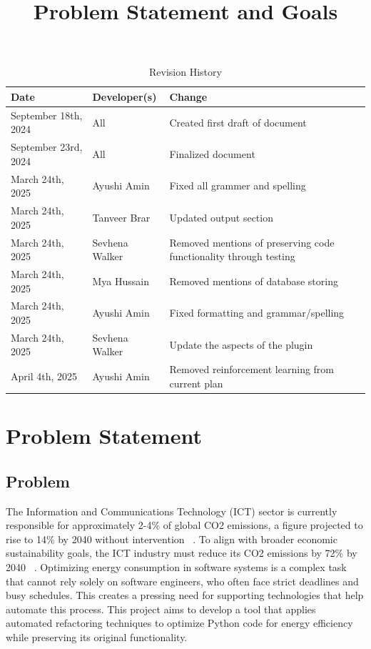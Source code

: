 \documentclass{article}
\title{Problem Statement and Goals\\\progname}
\author{\authname}
\date{}
\begin{document}
\maketitle

\begin{table}[hp]
  \caption{Revision History} \label{TblRevisionHistory}
  \begin{tabularx}{\textwidth}{llX}
    \toprule
    \textbf{Date} & \textbf{Developer(s)} & \textbf{Change}\\
    \midrule
    September 18th, 2024 & All & Created first draft of document\\
    September 23rd, 2024 & All & Finalized document\\
    March 24th, 2025 & Ayushi Amin & Fixed all grammer and spelling \\
    March 24th, 2025 & Tanveer Brar & Updated output section \\
    March 24th, 2025 & Sevhena Walker & Removed mentions of
    preserving code functionality through testing \\
    March 24th, 2025 & Mya Hussain & Removed mentions of database storing \\
    March 24th, 2025 & Ayushi Amin & Fixed formatting and grammar/spelling \\
    March 24th, 2025 & Sevhena Walker & Update the aspects of the plugin \\
    April 4th, 2025 & Ayushi Amin & Removed reinforcement learning
    from current plan \\
    \bottomrule
  \end{tabularx}
\end{table}

\newpage

\section{Problem Statement}

\subsection{Problem}

The Information and Communications Technology (ICT) sector is currently
responsible for approximately 2-4\% of global CO2 emissions, a figure
projected to rise to 14\% by 2040 without intervention
~\citep{BelkhirAndElmeligi2018}.
To align with broader economic sustainability goals,
the ICT industry must reduce its CO2 emissions by 72\% by
2040 ~\citep{FreitagAndBernersLee2021}. Optimizing energy
consumption in software systems is a complex task that cannot
rely solely on software engineers, who often face strict deadlines
and busy schedules. This creates a pressing need for supporting
technologies that help automate this process. This project aims
to develop a tool that applies automated refactoring techniques
to optimize Python code for energy efficiency while preserving its
original functionality.
\end{document}

